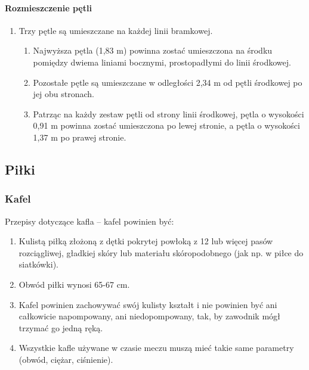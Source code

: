 \documentclass[12pt]{article}
\begin{document}
\paragraph{Rozmieszczenie pętli}
\begin{enumerate}
	\item Trzy pętle są umieszczane na każdej linii bramkowej.
	      \begin{enumerate}
		      \item Najwyższa pętla (1,83 m) powinna zostać umieszczona na środku
		            pomiędzy dwiema liniami bocznymi, prostopadłymi do linii środkowej.

		      \item Pozostałe pętle są umieszczane w odległości 2,34 m od pętli
		            środkowej po jej obu stronach.

		      \item Patrząc na każdy zestaw pętli od strony linii środkowej, pętla o
		            wysokości 0,91 m powinna zostać umieszczona po lewej stronie, a pętla o
		            wysokości 1,37 m po prawej stronie.
	      \end{enumerate}
\end{enumerate}

\subsection{Piłki}

\subsubsection{Kafel}
Przepisy dotyczące kafla -- kafel powinien być:

\begin{enumerate}
	\item Kulistą piłką złożoną z dętki pokrytej powłoką z 12 lub więcej pasów
	      rozciągliwej, gładkiej skóry lub materiału skóropodobnego (jak np. w
	      piłce do siatkówki).

	\item Obwód piłki wynosi 65-67 cm.

	\item Kafel powinien zachowywać swój kulisty kształt i nie powinien być ani
	      całkowicie napompowany, ani niedopompowany, tak, by zawodnik mógł
	      trzymać go jedną ręką.

	\item Wszystkie kafle używane w czasie meczu muszą mieć takie same
	      parametry (obwód, ciężar, ciśnienie).
\end{enumerate}
\end{document}
